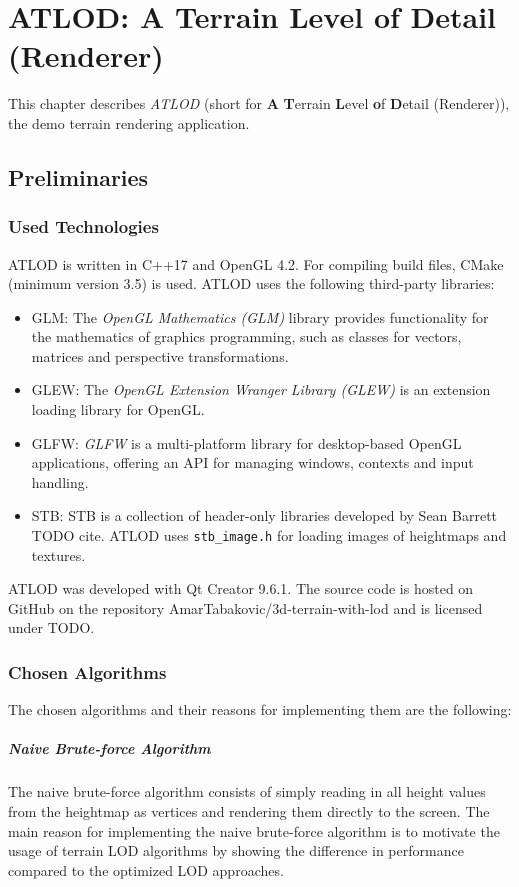 \chapter{ATLOD: A Terrain Level of Detail (Renderer)}
This chapter describes \textit{ATLOD} (short for \textbf{A} \textbf{T}errain \textbf{L}evel \textbf{o}f \textbf{D}etail (Renderer)), the demo terrain rendering application.

\section{Preliminaries}
\subsection{Used Technologies}
ATLOD is written in C++17 and OpenGL 4.2.
For compiling build files, CMake (minimum version 3.5) is used.
ATLOD uses the following third-party libraries:
\begin{itemize}
  \item GLM: The \textit{OpenGL Mathematics (GLM)} library provides functionality for the mathematics of graphics programming, such as classes for vectors, matrices and perspective transformations.
  \item GLEW: The \textit{OpenGL Extension Wranger Library (GLEW)} is an extension loading library for OpenGL. 
  \item GLFW: \textit{GLFW} is a multi-platform library for desktop-based OpenGL applications, offering an API for managing windows, contexts and input handling.
  \item STB: STB is a collection of header-only libraries developed by Sean Barrett TODO cite. ATLOD uses \texttt{stb\_image.h} for loading images of heightmaps and textures.
\end{itemize}

ATLOD was developed with Qt Creator 9.6.1. The source code is hosted on GitHub on the repository AmarTabakovic/3d-terrain-with-lod
and is licensed under TODO.

\subsection{Chosen Algorithms}
The chosen algorithms and their reasons for implementing them are the following:
\paragraph{Naive Brute-force Algorithm} The naive brute-force algorithm consists of simply reading in all height values from the heightmap as vertices and rendering them directly to the screen.
The main reason for implementing the naive brute-force algorithm is to motivate the usage of terrain LOD algorithms by showing the difference in performance
compared to the optimized LOD approaches.

